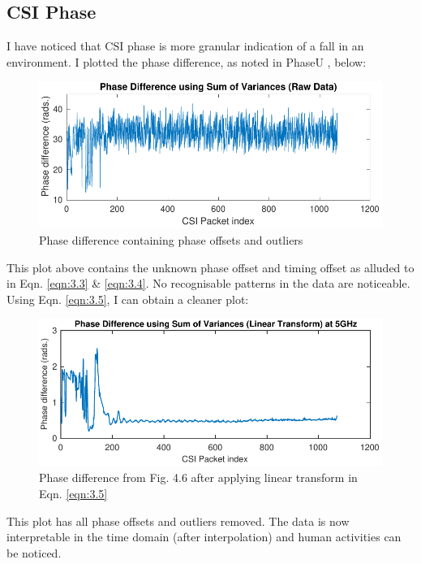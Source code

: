 \subsection{CSI Phase}
I have noticed that CSI phase is more granular indication of a fall in an environment. I plotted the phase difference, as noted in PhaseU \citep{PhaseU}, below:
\begin{figure}[H]
    \centering
    \includegraphics[scale=0.75]{Figures/uncleanPhaseFallCLASSROOM.pdf}
    \caption{Phase difference containing phase offsets and outliers}
    \label{fig:uncleanPhaseDiff}
\end{figure}
This plot above contains the unknown phase offset and timing offset as alluded to in Eqn. \ref{eqn:3.3} \& \ref{eqn:3.4}. No recognisable patterns in the data are noticeable. Using Eqn. \ref{eqn:3.5}, I can obtain a cleaner plot:
\begin{figure}[H]
    \centering
    \includegraphics[scale=0.75]{Figures/cleanPhaseFallCLASSROOM.pdf}
    \caption{Phase difference from Fig. 4.6 after applying linear transform in Eqn. \ref{eqn:3.5}}
    \label{fig:cleanerPhaseDiff}
\end{figure}
This plot has all phase offsets and outliers removed. The data is now interpretable in the time domain (after interpolation) and human activities can be noticed. 
